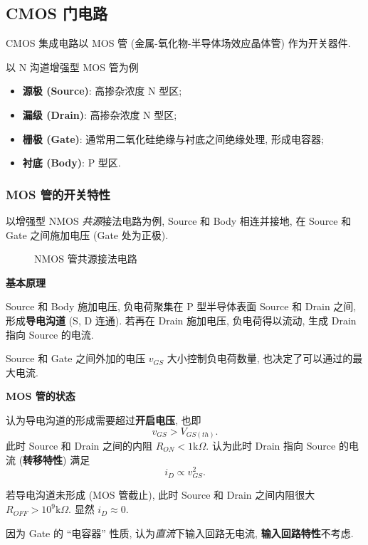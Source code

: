 \subsection{CMOS 门电路}
CMOS 集成电路以 MOS 管 (金属-氧化物-半导体场效应晶体管) 作为开关器件.

以 N 沟道增强型 MOS 管为例
\begin{itemize}
    \item \textbf{源极 (Source)}: 高掺杂浓度 N 型区;
    \item \textbf{漏级 (Drain)}: 高掺杂浓度 N 型区;
    \item \textbf{栅极 (Gate)}: 通常用二氧化硅绝缘与衬底之间绝缘处理, 形成电容器;
    \item \textbf{衬底 (Body)}: P 型区.
\end{itemize}

\subsubsection{MOS 管的开关特性}
以增强型 NMOS \textit{共源}接法电路为例, Source 和 Body 相连并接地, 在 Source 和 Gate 之间施加电压 (Gate 处为正极).

\begin{figure}[H]
    \centering

    \caption{NMOS 管共源接法电路}
\end{figure}

\textbf{基本原理}

Source 和 Body 施加电压, 负电荷聚集在 P 型半导体表面 Source 和 Drain 之间, 形成\textbf{导电沟道} (S, D 连通). 若再在 Drain 施加电压, 负电荷得以流动, 生成 Drain 指向 Source 的电流.

Source 和 Gate 之间外加的电压 $v_{GS}$ 大小控制负电荷数量, 也决定了可以通过的最大电流.

\textbf{MOS 管的状态}

认为导电沟道的形成需要超过\textbf{开启电压}, 也即
\begin{equation}
    v_{GS}>V_{GS(th)}.
\end{equation}
此时 Source 和 Drain 之间的内阻 $R_{ON}<1 \mathrm{k}\Omega$. 认为此时 Drain 指向 Source 的电流 (\textbf{转移特性}) 满足
\begin{equation}
    i_D\varpropto v_{GS}^2.
\end{equation}

若导电沟道未形成 (MOS 管截止), 此时 Source 和 Drain 之间内阻很大 $R_{OFF}>10^9 \mathrm{k}\Omega$. 显然 $i_D\approx 0$.

因为 Gate 的 ``电容器'' 性质, 认为\textit{直流}下输入回路无电流, \textbf{输入回路特性}不考虑.

